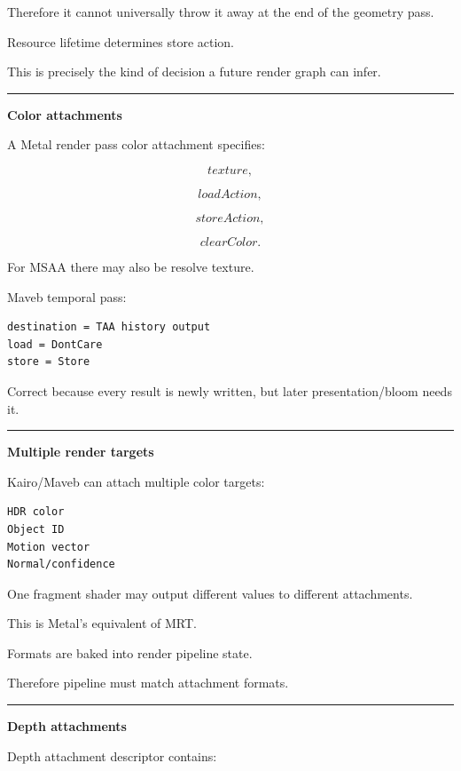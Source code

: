 Therefore it cannot universally throw it away at the end of the geometry pass.

Resource lifetime determines store action.

This is precisely the kind of decision a future render graph can infer.

\begin{center}\rule{0.5\linewidth}{0.5pt}\end{center}

\textbf{Color attachments}

A Metal render pass color attachment specifies:

\[
texture,
\]

\[
loadAction,
\]

\[
storeAction,
\]

\[
clearColor.
\]

For MSAA there may also be resolve texture.

Maveb temporal pass:

\begin{verbatim}
destination = TAA history output
load = DontCare
store = Store
\end{verbatim}

Correct because every result is newly written, but later presentation/bloom needs it.

\begin{center}\rule{0.5\linewidth}{0.5pt}\end{center}

\textbf{Multiple render targets}

Kairo/Maveb can attach multiple color targets:

\begin{verbatim}
HDR color
Object ID
Motion vector
Normal/confidence
\end{verbatim}

One fragment shader may output different values to different attachments.

This is Metal's equivalent of MRT.

Formats are baked into render pipeline state.

Therefore pipeline must match attachment formats.

\begin{center}\rule{0.5\linewidth}{0.5pt}\end{center}

\textbf{Depth attachments}

Depth attachment descriptor contains:


